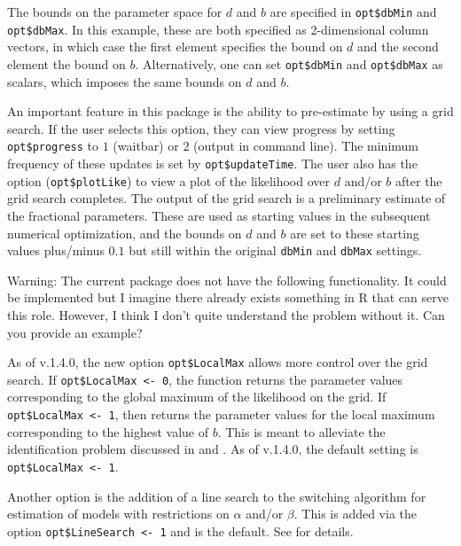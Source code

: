\documentclass[article]{jss}
\newcommand{\fct}[1]{\code{#1()}}
\begin{document}
The bounds on the parameter space for $d$ and $b$ are specified in \verb|opt$dbMin| and \verb|opt$dbMax|. In this example, these are both specified as 2-dimensional column vectors, in which case the first element specifies the bound on $d$ and the second element the bound on $b$. Alternatively, one can set \verb|opt$dbMin| and \verb|opt$dbMax| as scalars, which imposes the same bounds on $d$ and $b$. 

An important feature in this package is the ability to pre-estimate by using a grid search. If the user selects this option, they can view progress by setting \verb|opt$progress| to $1$ (waitbar) or $2$ (output in command line). The minimum frequency of these updates is set by \verb|opt$updateTime|. The user also has the option (\verb|opt$plotLike|) to view a plot of the likelihood over $d$ and/or $b$ after the grid search completes. The output of the grid search is a preliminary estimate of the fractional parameters. These are used as starting values in the subsequent numerical optimization, and the bounds on $d$ and $b$ are set to these starting values plus/minus $0.1$ but still within the original \verb|dbMin| and \verb|dbMax| settings.

\begin{leftbar}
Warning: The current package does not have the following functionality. 
It could be implemented but I imagine there already exists something in R that can serve this role. 
However, I think I don't quite understand the problem without it. 
Can you provide an example? 
\end{leftbar}

As of v.1.4.0, the new option \verb|opt$LocalMax| allows more control over the grid search. If \verb|opt$LocalMax <- 0|, the function \fct{FCVARlikeGrid} returns the parameter values corresponding to the global maximum of the likelihood on the grid. If \verb|opt$LocalMax <- 1|, then \fct{FCVARlikeGrid} returns the parameter values for the local maximum corresponding to the highest value of $b$. This is meant to alleviate the identification problem discussed in \citet[Section 2.3]{johniel2010} and \cite{Carlini2014}. As of v.1.4.0, the default setting is \verb|opt$LocalMax <- 1|.

Another option is the addition of a line search to the switching algorithm for estimation of models with restrictions on $\alpha$ and/or $\beta$. This is added via the option \verb|opt$LineSearch <- 1| and is the default. See \citet[Section 2.2]{Doornik2016} for details.
\end{document}

